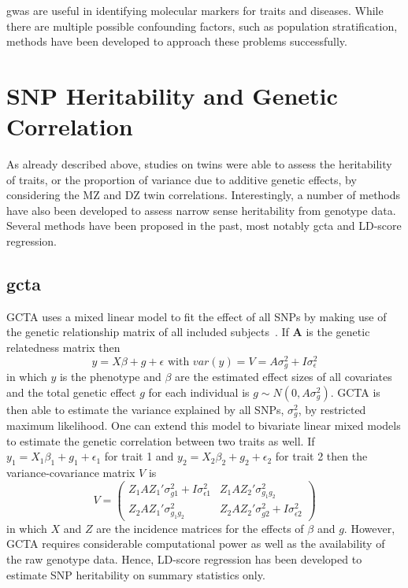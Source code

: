 \acrshort{gwas} are useful in identifying molecular markers for traits and diseases.
While there are multiple possible confounding factors, such as population stratification, methods have been developed to approach these problems successfully.


\section{SNP Heritability and Genetic Correlation}
\label{sec:heritability_and_genetic_correlation}

As already described above, studies on twins were able to assess the heritability of traits, or the proportion of variance due to additive genetic effects, by considering the MZ and DZ twin correlations.
Interestingly, a number of methods have also been developed to assess narrow sense heritability from genotype data.
Several methods have been proposed in the past, most notably \acrfull{gcta} and LD-score regression.

\subsection{\acrfull{gcta}}
\label{sub:gcta}

GCTA uses a mixed linear model to  fit the effect of all SNPs by making use of the genetic relationship matrix of all included subjects~\cite{Yang2011}.
If $\textbf{A}$ is the genetic relatedness matrix then
\begin{equation}
  y = X\beta + g + \epsilon \text{ with } var(y) = V = A\sigma^2_g + I\sigma^2_\epsilon
\end{equation}
in which $y$ is the phenotype and $\beta$ are the estimated effect sizes of all covariates and the total genetic effect $g$ for each individual is $g \sim N(0, A\sigma^2_g)$.
GCTA is then able to estimate the variance explained by all SNPs, $\sigma^2_g$, by restricted maximum likelihood.
One can extend this model to bivariate linear mixed models to estimate the genetic correlation between two traits as well.
If $y_1 = X_1\beta_1 + g_1 + \epsilon_1$ for trait 1 and $y_2= X_2\beta_2 + g_2 + \epsilon_2$ for trait 2 then the variance-covariance matrix $V$ is
\begin{equation}
  V = 
  \begin{pmatrix}
    Z_1AZ_1'\sigma^2_{g1} + I\sigma^2_{\epsilon 1} & Z_1AZ_2'\sigma^2_{g_1g_2} \\
    Z_2AZ_1'\sigma^2_{g_1g_2} & Z_2AZ_2'\sigma^2_{g2} + I\sigma^2_{\epsilon 2}
  \end{pmatrix}
\end{equation}
in which $X$ and $Z$ are the incidence matrices for the effects of $\beta$ and $g$.
However, GCTA requires considerable computational power as well as the availability of the raw genotype data.
Hence, LD-score regression has been developed to estimate SNP heritability on summary statistics only.

